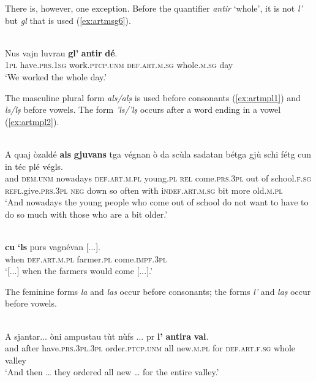 There is, however, one exception. Before the quantifier \textit{antir} `whole', it is not \textit{l'} but \textit{gl} that is used (\ref{ex:artmsg6}).

\ea\label{ex:artmsg6}
\\
\gll  Nus vajn luvrau \textbf{gl'} \textbf{antir} \textbf{dé}.  \\
\textsc{1pl} have.\textsc{prs.1sg} work.\textsc{ptcp.unm} \textsc{def.art.m.sg} whole.\textsc{m.sg} day\\
\glt `We worked the whole day.'
\z

The masculine plural form \textit{als/alṣ} is used before consonants (\ref{ex:artmpl1}) and \textit{ls/lṣ} before vowels. The form \textit{'ls/'lṣ} occurs after a word ending in a vowel (\ref{ex:artmpl2}).

\ea
\label{ex:artmpl1}
\\
\gll A quaj òzaldé \textbf{als} \textbf{gjuvans} tga végnan ò da scùla sadatan bétga gjù schi fétg cun in téc plé végls.   \\
and \textsc{dem.unm} nowadays \textsc{def.art.m.pl} young.\textsc{pl} \textsc{rel} come.\textsc{prs.3pl} out of school.\textsc{f.sg} \textsc{refl}.give.\textsc{prs.3pl} \textsc{neg} down so often with i\textsc{ndef.art.m.sg} bit more old.\textsc{m.pl}\\
\glt `And nowadays the young people who come out of school do not want to have to do so much with those who are a bit older.'
\z

\ea
\label{ex:artmpl2}
\\
\gll [...] \textbf{cu} \textbf{`ls} purs vagnévan [...].\\
{} when \textsc{def.art.m.pl} farmer.\textsc{pl} come.\textsc{impf.3pl}\\
\glt `[...] when the farmers would come [...].'
\z

The feminine forms \textit{la} and \textit{las} occur before consonants; the forms \textit{l'} and \textit{laṣ} occur before vowels.

\ea\label{}
\\
\gll A sjantar... òni ampustau tùt nùfs ... pr \textbf{l'} \textbf{antira} \textbf{val}.\\
and after have.\textsc{prs.3pl.3pl} order.\textsc{ptcp.unm} all new.\textsc{m.pl} {} for \textsc{def.art.f.sg} whole valley\\
\glt `And then … they ordered all new … for the entire valley.'
\z

